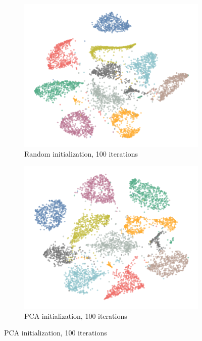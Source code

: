 \begin{figure}[tbp]
  \par\bigskip
  \begin{subfigure}{.45\linewidth}
    \centering
    \includegraphics[width=\linewidth]{img/random_100_iters-1}
    \caption{Random initialization, 100 iterations}
  \end{subfigure}
  \begin{subfigure}{.45\linewidth}
    \centering
    \includegraphics[width=\linewidth]{img/pca_100_iters-1}
    \caption{PCA initialization, 100 iterations}
  \end{subfigure}
  \par\bigskip

\end{figure}
